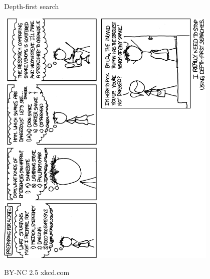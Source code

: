 \documentclass[a6paper,fontsize=10pt,twoside,open=right]{scrbook}
\begin{document}
\newpage

\vspace{15pt}

\vspace{15pt}

\newpage

\vspace{15pt}

\newpage

\vspace{15pt}

\newpage

\vspace{15pt}

\newpage

\vspace{15pt}

\vspace{15pt}

\vspace{15pt}

\newpage

\vspace{15pt}

\vspace{15pt}

\newpage

\vspace{15pt}

\newpage

\vspace{15pt}

\newpage
\null
\vfill
{}
\begin{center}
  \tiny{Depth-first search}\par
  \vspace{5pt}
  \includegraphics[keepaspectratio,width=0.8\textwidth]{elements/images/dfs.png}\par
  \vspace{5pt}
  \tiny{BY-NC 2.5 xkcd.com}
\end{center}
\end{document}
